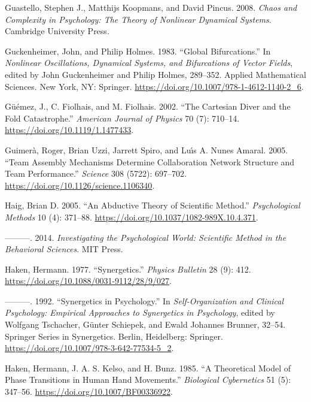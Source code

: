 \documentclass[
  a4paper,
  DIV=11,
  numbers=noendperiod,
  oneside]{scrreprt}
\newlength{\cslhangindent}
\newenvironment{CSLReferences}[2] %
 {\begin{list}{}{%
  \setlength{\itemindent}{0pt}
  \setlength{\leftmargin}{0pt}
  \setlength{\parsep}{0pt}
  \ifodd #1
   \setlength{\leftmargin}{\cslhangindent}
   \setlength{\itemindent}{-1\cslhangindent}
  \fi
  \setlength{\itemsep}{#2\baselineskip}}}
 {\end{list}}
\begin{document}
\begin{CSLReferences}{1}{0}
Guastello, Stephen J., Matthijs Koopmans, and David Pincus. 2008.
\emph{Chaos and {Complexity} in {Psychology}: {The Theory} of {Nonlinear
Dynamical Systems}}. {Cambridge University Press}.

Guckenheimer, John, and Philip Holmes. 1983. {``Global
{Bifurcations}.''} In \emph{Nonlinear {Oscillations}, {Dynamical
Systems}, and {Bifurcations} of {Vector Fields}}, edited by John
Guckenheimer and Philip Holmes, 289--352. Applied {Mathematical
Sciences}. {New York, NY}: {Springer}.
\url{https://doi.org/10.1007/978-1-4612-1140-2_6}.

Güémez, J., C. Fiolhais, and M. Fiolhais. 2002. {``The {Cartesian} Diver
and the Fold Catastrophe.''} \emph{American Journal of Physics} 70 (7):
710--14. \url{https://doi.org/10.1119/1.1477433}.

Guimerà, Roger, Brian Uzzi, Jarrett Spiro, and Luı́s A. Nunes Amaral.
2005. {``Team {Assembly Mechanisms Determine Collaboration Network
Structure} and {Team Performance}.''} \emph{Science} 308 (5722):
697--702. \url{https://doi.org/10.1126/science.1106340}.

Haig, Brian D. 2005. {``An Abductive Theory of Scientific Method.''}
\emph{Psychological Methods} 10 (4): 371--88.
\url{https://doi.org/10.1037/1082-989X.10.4.371}.

---------. 2014. \emph{Investigating the {Psychological World}:
{Scientific Method} in the {Behavioral Sciences}}. {MIT Press}.

Haken, Hermann. 1977. {``Synergetics.''} \emph{Physics Bulletin} 28 (9):
412. \url{https://doi.org/10.1088/0031-9112/28/9/027}.

---------. 1992. {``Synergetics in {Psychology}.''} In
\emph{Self-{Organization} and {Clinical Psychology}: {Empirical
Approaches} to {Synergetics} in {Psychology}}, edited by Wolfgang
Tschacher, Günter Schiepek, and Ewald Johannes Brunner, 32--54. Springer
{Series} in {Synergetics}. {Berlin, Heidelberg}: {Springer}.
\url{https://doi.org/10.1007/978-3-642-77534-5_2}.

Haken, Hermann, J. A. S. Kelso, and H. Bunz. 1985. {``A Theoretical
Model of Phase Transitions in Human Hand Movements.''} \emph{Biological
Cybernetics} 51 (5): 347--56. \url{https://doi.org/10.1007/BF00336922}.


\end{CSLReferences}
\end{document}
